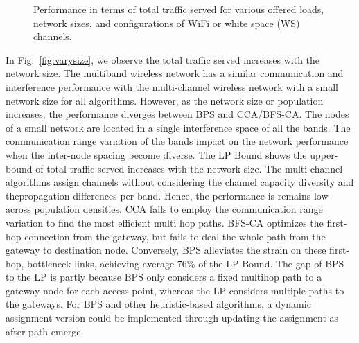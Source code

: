 \begin{figure}[t]
\centering
{}
\hfill
\caption{Performance in terms of total traffic served for various offered loads, network sizes, and configurations of WiFi or white space (WS) channels.}
\label{fig:all3figs}
\vspace{-0.3in}
\end{figure}

In Fig.~\ref{fig:varysize}, we observe the total traffic served increases with the network size. 
The multiband wireless network has a similar communication and interference performance with 
the multi-channel wireless network with a small network size for all algorithms. 
However, as the network size or population increases, the performance diverges between BPS and 
CCA/BFS-CA.
The nodes of a small network are located in a single interference space of all the bands.
The communication range variation of the bands impact on the network performance when the inter-node spacing become diverse. 
The LP Bound shows the upper-bound of total traffic served increases with the network size.
The multi-channel algorithms assign channels without considering the channel capacity diversity and thepropagation 
differences per band. Hence, the performance 
is remains low across population densities. 
CCA fails to employ the communication range variation to find the most efficient multi hop paths. 
BFS-CA optimizes the first-hop connection from the gateway, but fails to deal the whole path 
from the gateway to destination node. Conversely, BPS alleviates the strain on these first-hop, 
bottleneck links, achieving average 76\% of the LP Bound. The gap of BPS to the LP is partly because 
BPS only considers a fixed multihop path to a gateway node for each access point, whereas the 
LP considers multiple paths to the gateways. For BPS and other heuristic-based algorithms, a dynamic 
assignment version could be implemented through updating the assignment as after path emerge.

